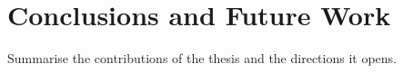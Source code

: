 \chapter{Conclusions and Future Work}
\label{chap:conclusion}

Summarise the contributions of the thesis and the directions it opens.
